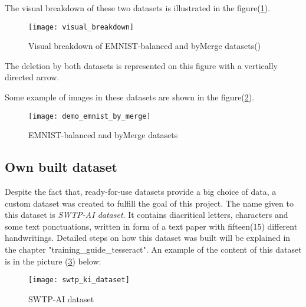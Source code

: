 \noindent
The visual breakdown of these two datasets is illustrated in the figure(\ref{Abb:visual_breakdown}).

\begin{figure}[htb]
	\centering
	\texttt{[image: visual\_breakdown]}
	\caption[Text datasets]{Visual breakdown of EMNIST-balanced and byMerge datasets(\cite{[2]})} \label{Abb:visual_breakdown}
\end{figure}

The deletion by both datasets is represented on this figure with a vertically directed arrow.

\noindent
Some example of images in these datasets are shown in the figure(\ref{Abb:balanced_and_byMerge}).

\begin{figure}[htb]
	\centering
	\texttt{[image: demo\_emnist\_by\_merge]}
	\caption[Text datasets]{EMNIST-balanced and byMerge datasets}\label{Abb:balanced_and_byMerge}
\end{figure}

\newpage
\subsection{Own built dataset}
Despite the fact that, ready-for-use datasets provide a big choice of data, a custom dataset was created to fulfill the goal 
of this project. 
The name given to this dataset is \emph{SWTP-AI dataset}.
It contains diacritical letters, characters and some text ponctuations, written in form of a text paper with
fifteen(15) different handwritings. 
Detailed steps on how this dataset was built will be explained in the chapter "training\_guide\_tesseract". 
An example of the content of this dataset is in the picture (\ref{Abb:SWTP_KI_dataset}) below:

\begin{figure}[htb]
	\centering
	\texttt{[image: swtp\_ki\_dataset]}
	\caption[custom dataset]{SWTP-AI dataset}\label{Abb:SWTP_KI_dataset}
\end{figure}